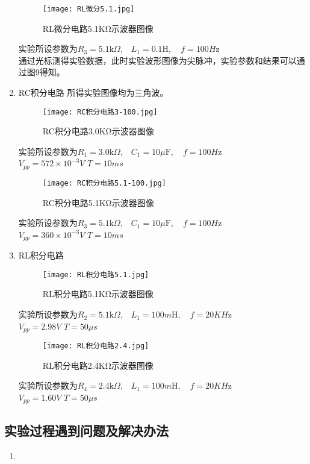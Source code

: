 \documentclass[dvipsnames, svgnames,a4paper,11pt]{article}
\begin{document}
\begin{enumerate}
\begin{figure}[{H}]
	\centering
	\texttt{[image: RL微分5.1.jpg]}
	\caption{RL微分电路5.1KΩ示波器图像}
	\label{}
\end{figure}
实验所设参数为$R_3=5.1\text{k}\Omega\text{,}\quad L_1=0.1\text{H},\quad f=100H\text{z}$\\
\indent 通过光标测得实验数据，此时实验波形图像为尖脉冲，实验参数和结果可以通过图9得知。
\item RC积分电路
 所得实验图像均为三角波。
\begin{figure}[{H}]
	\centering
	\texttt{[image: RC积分电路3-100.jpg]}
	\caption{RC积分电路3.0KΩ示波器图像}
	\label{}
\end{figure}
实验所设参数为$R_1=3.0\text{k}\Omega\text{,}\quad C_1=10\mu\text{F},\quad f=100H\text{z}$\\
$V_{pp}=572 \times 10^{-3}V$ \quad $T=10ms$
\begin{figure}[{H}]
	\centering
	\texttt{[image: RC积分电路5.1-100.jpg]}
	\caption{RC积分电路5.1KΩ示波器图像}
	\label{}
\end{figure}
实验所设参数为$R_3=5.1\text{k}\Omega\text{,}\quad C_1=10\mu\text{F},\quad f=100H\text{z}$\\
$V_{pp}=360 \times 10^{-3}V$ \quad $T=10ms$
\item RL积分电路 
 \begin{figure}[{H}]
	\centering
	\texttt{[image: RL积分电路5.1.jpg]}
	\caption{RL积分电路5.1KΩ示波器图像}
	\label{}
 \end{figure}
 实验所设参数为$R_2=5.1\text{k}\Omega\text{,}\quad L_1=100m\text{H},\quad f=20KH\text{z}$\\
$V_{pp}=2.98 V$ \quad $T=50\mu s$
\begin{figure}[{H}]
	\centering
	\texttt{[image: RL积分电路2.4.jpg]}
	\caption{RL积分电路2.4KΩ示波器图像}
	\label{}
\end{figure}
实验所设参数为$R_4=2.4\text{k}\Omega\text{,}\quad L_1=100m\text{H},\quad f=20KH\text{z}$\\
$V_{pp}=1.60 V$ \quad $T=50\mu s$

	\end{enumerate}
	
	

	\subsection{实验过程遇到问题及解决办法}
	\begin{enumerate}
		\item 
	\end{enumerate}
	
\end{document}
